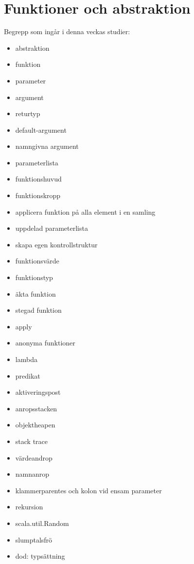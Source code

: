 \chapter{Funktioner och abstraktion}\label{chapter:W03}
Begrepp som ingår i denna veckas studier:
\begin{multicols}{2}\begin{itemize}[noitemsep,label={$\square$},leftmargin=*]
\item abstraktion
\item funktion
\item parameter
\item argument
\item returtyp
\item default-argument
\item namngivna argument
\item parameterlista
\item funktionshuvud
\item funktionskropp
\item applicera funktion på alla element i en samling
\item uppdelad parameterlista
\item skapa egen kontrollstruktur
\item funktionsvärde
\item funktionstyp
\item äkta funktion
\item stegad funktion
\item apply
\item anonyma funktioner
\item lambda
\item predikat
\item aktiveringspost
\item anropsstacken
\item objektheapen
\item stack trace
\item värdeandrop
\item namnanrop
\item klammerparentes och kolon vid ensam parameter
\item rekursion
\item scala.util.Random
\item slumptalsfrö
\item dod: typsättning\end{itemize}\end{multicols}
